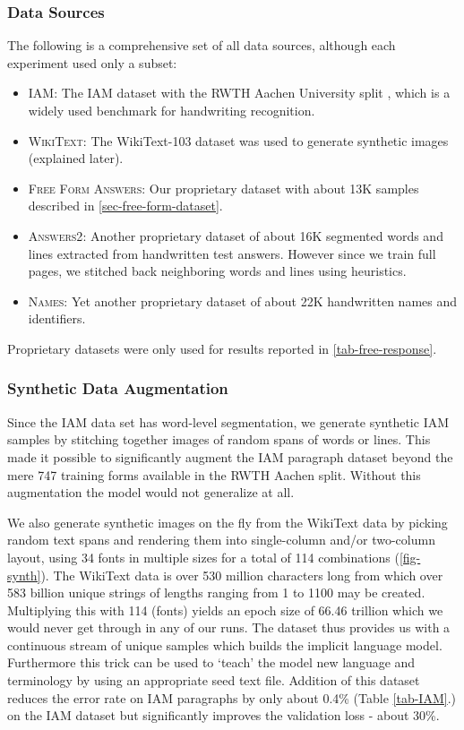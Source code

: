 \documentclass[runningheads]{llncs}
\begin{document}
\subsubsection{Data Sources}
The following is a comprehensive set of all data sources, although each experiment used only a subset:
\begin{itemize}
    \item \textsc{IAM}: The {\small IAM} dataset \citep{IAM-database} with the {\small RWTH} Aachen University split \citep{SLR56}, which is a widely used benchmark for handwriting recognition.
    \item \textsc{WikiText}: The WikiText-103 \citep{DBLP:journals/corr/MerityXBS16} dataset was used to generate synthetic images (explained later).
    \item \textsc{Free Form Answers}: Our proprietary dataset with about 13K samples described in \autoref{sec-free-form-dataset}.
    \item \textsc{Answers2}: Another proprietary dataset of about 16K segmented words and lines extracted from handwritten test answers. However since we train full pages, we stitched back neighboring words and lines using heuristics.
    \item \textsc{Names}: Yet another proprietary dataset of about 22K handwritten names and identifiers.
\end{itemize}
Proprietary datasets were only used for results reported in \autoref{tab-free-response}.

\subsubsection{Synthetic Data Augmentation}\label{sec-synth}
Since the IAM data set has word-level segmentation, we generate synthetic IAM samples by stitching together images of random spans of words or lines. This made it possible to significantly augment the IAM paragraph dataset beyond the mere 747 training forms available in the RWTH Aachen split. Without this augmentation the model would not generalize at all.

We also generate synthetic images on the fly from the WikiText data by picking random text spans and rendering them into single-column and/or two-column layout, using 34 fonts in multiple sizes for a total of 114 combinations (\autoref{fig-synth}). The WikiText data is over 530 million characters long from which over 583 billion unique strings of lengths ranging from 1 to 1100 may be created. Multiplying this with 114 (fonts) yields an epoch size of 66.46 trillion which we would never get through in any of our runs. The dataset thus provides us with a continuous stream of unique samples which builds the implicit language model. Furthermore this trick can be used to `teach' the model new language and terminology by using an appropriate seed text file. Addition of this dataset reduces the error rate on IAM paragraphs by only about 0.4\% (Table \ref{tab-IAM}.) on the IAM dataset but significantly improves the validation loss - about 30\%.
\end{document}
